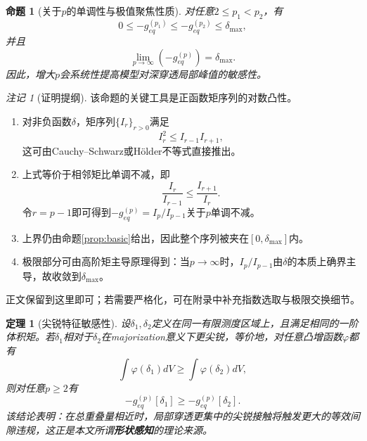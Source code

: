 ﻿\documentclass[12pt, a4paper]{ctexart}
\theoremstyle{plain}
\newtheorem{proposition}{命题}
\newtheorem{theorem}{定理}
\theoremstyle{remark}
\newtheorem{remark}{注记}
\begin{document}
\begin{proposition}[关于$p$的单调性与极值聚焦性质]\label{prop:monotone}
对任意$2 \le p_1 < p_2$，有
\begin{equation}
    0 \le -g_{eq}^{(p_1)} \le -g_{eq}^{(p_2)} \le \delta_{\max},
\end{equation}
并且
\begin{equation}
    \lim_{p \to \infty} \left( -g_{eq}^{(p)} \right) = \delta_{\max}.
\end{equation}
因此，增大$p$会系统性提高模型对深穿透局部峰值的敏感性。
\end{proposition}

\begin{remark}[证明提纲]
该命题的关键工具是正函数矩序列的对数凸性。
\begin{enumerate}
    \item 对非负函数$\delta$，矩序列$\{I_r\}_{r>0}$满足
    \begin{equation}
        I_r^2 \le I_{r-1} I_{r+1},
    \end{equation}
    这可由Cauchy--Schwarz或H\"older不等式直接推出。
    \item 上式等价于相邻矩比单调不减，即
    \begin{equation}
        \frac{I_r}{I_{r-1}} \le \frac{I_{r+1}}{I_r}.
    \end{equation}
    令$r = p-1$即可得到$-g_{eq}^{(p)} = I_p/I_{p-1}$关于$p$单调不减。
    \item 上界仍由命题\ref{prop:basic}给出，因此整个序列被夹在$[0,\delta_{\max}]$内。
    \item 极限部分可由高阶矩主导原理得到：当$p \to \infty$时，$I_p/I_{p-1}$由$\delta$的本质上确界主导，故收敛到$\delta_{\max}$。
\end{enumerate}
正文保留到这里即可；若需要严格化，可在附录中补充指数选取与极限交换细节。
\end{remark}

\begin{theorem}[尖锐特征敏感性]\label{thm:sharp}
设$\delta_1,\delta_2$定义在同一有限测度区域上，且满足相同的一阶体积矩。若$\delta_1$相对于$\delta_2$在majorization意义下更尖锐，等价地，对任意凸增函数$\varphi$都有
\begin{equation}
    \int \varphi(\delta_1) dV \ge \int \varphi(\delta_2) dV,
\end{equation}
则对任意$p \ge 2$有
\begin{equation}
    -g_{eq}^{(p)}[\delta_1] \ge -g_{eq}^{(p)}[\delta_2].
\end{equation}
该结论表明：在总重叠量相近时，局部穿透更集中的尖锐接触将触发更大的等效间隙违规，这正是本文所谓\textbf{形状感知}的理论来源。
\end{theorem}
\end{document}

